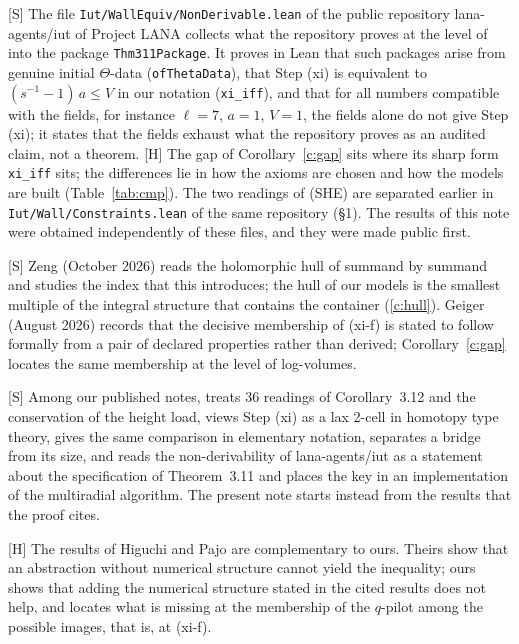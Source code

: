 \documentclass[11pt]{article}
\theoremstyle{plain}
\theoremstyle{definition}
\theoremstyle{remark}
\newcommand{\Smark}{\textup{[S]}}
\newcommand{\Hmark}{\textup{[H]}}
\begin{document}
\Smark{} The file \texttt{Iut/WallEquiv/NonDerivable.lean} of the public repository
lana-agents/iut of Project LANA \cite{lana} collects what the repository proves at the level
of \cite[Thm.~3.11]{IUT3} into the package \texttt{Thm311Package}. It proves in Lean that
such packages arise from genuine initial $\Theta$-data (\texttt{ofThetaData}), that Step (xi)
is equivalent to $(s^{-1}-1)\,a\le V$ in our notation (\texttt{xi\_iff}), and that for all
numbers compatible with the fields, for instance $\ell=7$, $a=1$, $V=1$, the fields alone do
not give Step (xi); it states that the fields exhaust what the repository proves as an
audited claim, not a theorem. \Hmark{} The gap of Corollary~\ref{c:gap} sits where its sharp
form \texttt{xi\_iff} sits; the differences lie in how the axioms are chosen and how the
models are built (Table~\ref{tab:cmp}). The two readings of (SHE) are separated earlier in
\texttt{Iut/Wall/Constraints.lean} of the same repository (\S1). The results of this note were
obtained independently of these files, and they were made public first.

\Smark{} Zeng \cite{Zeng} (October 2026) reads the holomorphic hull of
\cite[Rem.~3.9.5]{IUT3} summand by summand and studies the index that this introduces; the
hull of our models is the smallest multiple of the integral structure that contains the
container (\ref{c:hull}). Geiger \cite{Geiger} (August 2026) records that the decisive membership
of (xi-f) is stated to follow formally from a pair of declared properties rather than derived; Corollary~\ref{c:gap} locates the
same membership at the level of log-volumes.

\Smark{} Among our published notes, \cite{RF} treats 36 readings of Corollary~3.12 and the
conservation of the height load, \cite{SL} views Step (xi) as a lax 2-cell in homotopy type
theory, \cite{II} gives the same comparison in elementary notation, \cite{BS} separates a
bridge from its size, and \cite{TC} reads the non-derivability of lana-agents/iut as a
statement about the specification of Theorem~3.11 and places the key in an implementation
of the multiradial algorithm. The present note starts instead from the results that the
proof cites.

\Hmark{} The results of Higuchi and Pajo are complementary to ours. Theirs show that an
abstraction without numerical structure cannot yield the inequality; ours shows that adding the
numerical structure stated in the cited results does not help, and locates what is
missing at the membership of the $q$-pilot among the possible images, that is, at (xi-f).
\end{document}
